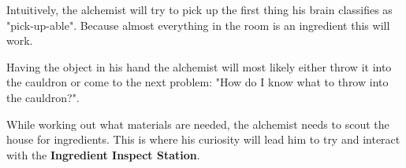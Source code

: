 \documentclass{vgtc}
\begin{document}
Intuitively, the alchemist will try to pick up the first thing his brain classifies as "pick-up-able". Because
almost everything in the room is an ingredient this will work.

Having the object in his hand the alchemist will most likely either throw it into the cauldron or come to the next
problem: "How do I know what to throw into the cauldron?".

While working out what materials are needed, the alchemist needs to scout the house for ingredients. This is where
his curiosity will lead him to try and interact with the \textbf{Ingredient Inspect Station}.

\end{document}

